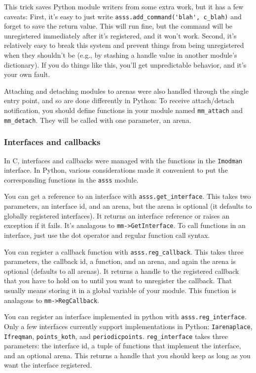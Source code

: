 \documentclass{article}
\begin{document}
This trick saves Python module writers from some extra work, but it has
a few caveats: First, it's easy to just write
\verb/asss.add_command('blah', c_blah)/ and forget to save the return
value. This will run fine, but the command will be unregistered
immediately after it's registered, and it won't work. Second, it's
relatively easy to break this system and prevent things from being
unregistered when they shouldn't be (e.g., by stashing a handle value in
another module's dictionary). If you do things like this, you'll get
unpredictable behavior, and it's your own fault.

Attaching and detaching modules to arenas were also handled through the
single entry point, and so are done differently in Python: To receive
attach/detach notification, you should define functions in your module
named \verb/mm_attach/ and \verb/mm_detach/. They will be called with
one parameter, an arena.


\subsubsection{Interfaces and callbacks}

In C, interfaces and callbacks were managed with the functions in the
\verb/Imodman/ interface. In Python, various considerations made it
convenient to put the corresponding functions in the \verb/asss/ module.

You can get a reference to an interface with \verb/asss.get_interface/.
This takes two parameters, an interface id, and an arena, but the arena
is optional (it defaults to globally registered interfaces). It returns
an interface reference or raises an exception if it fails. It's
analagous to \verb/mm->GetInterface/. To call functions in an interface,
just use the dot operator and regular function call syntax.

You can register a callback function with \verb/asss.reg_callback/. This
takes three parameters, the callback id, a function, and an arena, and
again the arena is optional (defaults to all arenas). It returns a
handle to the registered callback that you have to hold on to until you
want to unregister the callback. That usually means storing it in a
global variable of your module. This function is analagous to
\verb/mm->RegCallback/.

You can register an interface implemented in python with
\verb/asss.reg_interface/. Only a few interfaces currently support
implementations in Python: \verb/Iarenaplace/, \verb/Ifreqman/,
\verb/points_koth/, and \verb/periodicpoints/. \verb/reg_interface/
takes three parameters: the interface id, a tuple of functions that
implement the interface, and an optional arena. This returns a handle
that you should keep as long as you want the interface registered.
\end{document}
